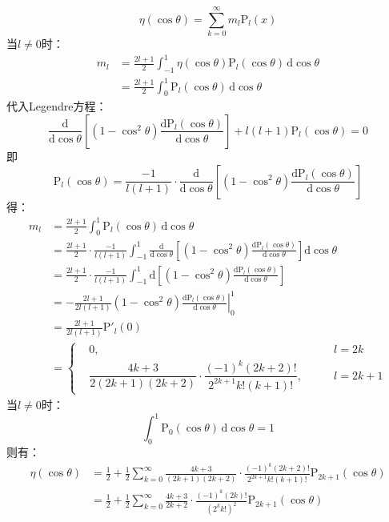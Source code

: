 \documentclass[fontset=windows]{ctexart}
\begin{document}
\begin{itemize}
    \[
    \eta(\cos\theta) = \sum_{k=0}^{\infty}m_l \mathrm{P}_l(x)
    \]
    当$l\neq0$时：
    \begin{align*}
        m_l
        &= \frac{2l+1}{2}\int_{-1}^{1}\eta(\cos\theta)\mathrm{P}_l(\cos\theta)\,\mathrm{d}\cos\theta \\
        &= \frac{2l+1}{2}\int_{0}^{1}\mathrm{P}_l(\cos\theta)\,\mathrm{d}\cos\theta
    \end{align*}
    代入Legendre方程：
    \[
    \frac{\mathrm{d}}{\mathrm{d}\cos\theta}\left[(1-\cos^2\theta)\frac{\mathrm{d}\mathrm{P}_l(\cos\theta)}{\mathrm{d}\cos\theta}\right] + l(l+1)\mathrm{P}_l(\cos\theta) = 0
    \]
    即
    \[
    \mathrm{P}_l(\cos\theta) = \frac{-1}{l(l+1)}\cdot\frac{\mathrm{d}}{\mathrm{d}\cos\theta}\left[(1-\cos^2\theta)\frac{\mathrm{d}\mathrm{P}_l(\cos\theta)}{\mathrm{d}\cos\theta}\right]
    \]
    得：
    \begin{align*}
        m_l
        &= \frac{2l+1}{2}\int_{0}^{1}\mathrm{P}_l(\cos\theta)\,\mathrm{d}\cos\theta \\
        &= \frac{2l+1}{2}\cdot\frac{-1}{l(l+1)}\int_{-1}^{1}\frac{\mathrm{d}}{\mathrm{d}\cos\theta}\left[(1-\cos^2\theta)\frac{\mathrm{d}\mathrm{P}_l(\cos\theta)}{\mathrm{d}\cos\theta}\right]\mathrm{d}\cos\theta \\
        &= \frac{2l+1}{2}\cdot\frac{-1}{l(l+1)}\int_{-1}^{1}\mathrm{d}\left[(1-\cos^2\theta)\frac{\mathrm{d}\mathrm{P}_l(\cos\theta)}{\mathrm{d}\cos\theta}\right] \\
        &= \left.-\frac{2l+1}{2l(l+1)}(1-\cos^2\theta)\frac{\mathrm{d}\mathrm{P}_l(\cos\theta)}{\mathrm{d}\cos\theta}\right|_0^1 \\
        &= \frac{2l+1}{2l(l+1)}\mathrm{P}'_l(0) \\
        &= \left\{
        \begin{matrix}
            &0,\qquad &l = 2k \\
            &\dfrac{4k+3}{2(2k+1)(2k+2)}\cdot\dfrac{(-1)^k (2k+2)!}{2^{2k+1} k!(k+1)!},\qquad &l = 2k+1
        \end{matrix}
        \right.
    \end{align*}
    当$l\neq0$时：
    \[
    \int_{0}^{1}\mathrm{P}_0(\cos\theta)\,\mathrm{d}\cos\theta = 1
    \]
    则有：
    \begin{align*}
    \eta(\cos\theta)
    &= \frac{1}{2} + \frac{1}{2}\sum_{k=0}^{\infty}\frac{4k+3}{(2k+1)(2k+2)}\cdot\frac{(-1)^k (2k+2)!}{2^{2k+1} k!(k+1)!}\mathrm{P}_{2k+1}(\cos\theta) \\
    &= \frac{1}{2} + \frac{1}{2}\sum_{k=0}^{\infty}\frac{4k+3}{2k+2}\cdot\frac{(-1)^k (2k)!}{\left(2^{k}k!\right)^2}\mathrm{P}_{2k+1}(\cos\theta)

\end{align*}
\end{itemize}
\end{document}
